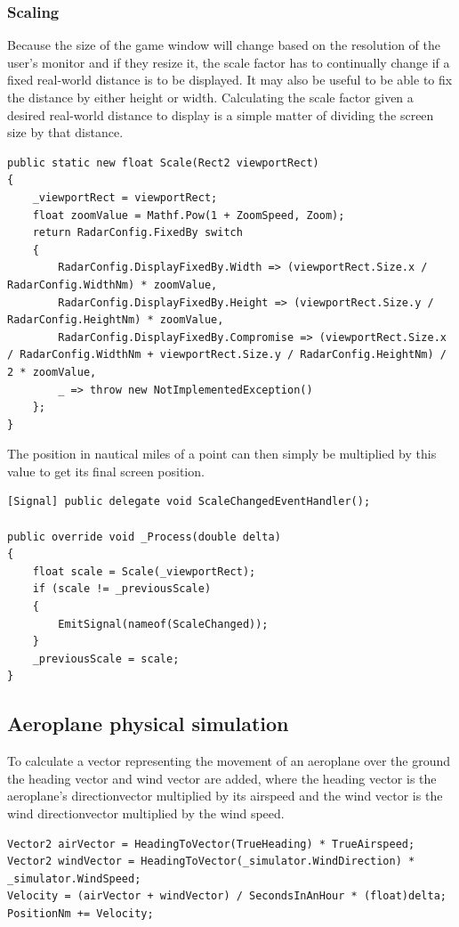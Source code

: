 \documentclass{article}
\begin{document}
\subsubsection{Scaling}
Because the size of the game window will change based on the resolution of the user's monitor and if they resize it, the scale factor has to continually change if a fixed real-world distance is to be displayed.
It may also be useful to be able to fix the distance by either height or width.
Calculating the scale factor given a desired real-world distance to display is a simple matter of dividing the screen size by that distance.
\lstset{style=csharp}
\begin{lstlisting}[caption=Calculating the scale]
public static new float Scale(Rect2 viewportRect)
{
    _viewportRect = viewportRect;
    float zoomValue = Mathf.Pow(1 + ZoomSpeed, Zoom);
    return RadarConfig.FixedBy switch
    {
        RadarConfig.DisplayFixedBy.Width => (viewportRect.Size.x / RadarConfig.WidthNm) * zoomValue,
        RadarConfig.DisplayFixedBy.Height => (viewportRect.Size.y / RadarConfig.HeightNm) * zoomValue,
        RadarConfig.DisplayFixedBy.Compromise => (viewportRect.Size.x / RadarConfig.WidthNm + viewportRect.Size.y / RadarConfig.HeightNm) / 2 * zoomValue,
        _ => throw new NotImplementedException()
    };
}
\end{lstlisting}
The position in nautical miles of a point can then simply be multiplied by this value to get its final screen position.
\begin{lstlisting}[caption=Notifying other modules of a change in scale]
[Signal] public delegate void ScaleChangedEventHandler();

public override void _Process(double delta)
{
    float scale = Scale(_viewportRect);
    if (scale != _previousScale)
    {
        EmitSignal(nameof(ScaleChanged));
    }
    _previousScale = scale;
}
\end{lstlisting}


\subsection{Aeroplane physical simulation}
To calculate a \gls{vector} representing the movement of an aeroplane over the ground the heading \gls{vector} and wind \gls{vector} are added, where the \gls{heading} \gls{vector} is the aeroplane's \gls{directionvector} multiplied by its \gls{airspeed} and the wind \gls{vector} is the wind \gls{directionvector} multiplied by the wind speed.
\lstset{style=csharp}
\begin{lstlisting}[caption=Extract of the aeroplane physics process]
Vector2 airVector = HeadingToVector(TrueHeading) * TrueAirspeed;
Vector2 windVector = HeadingToVector(_simulator.WindDirection) * _simulator.WindSpeed;
Velocity = (airVector + windVector) / SecondsInAnHour * (float)delta;
PositionNm += Velocity;
\end{lstlisting}
\end{document}
